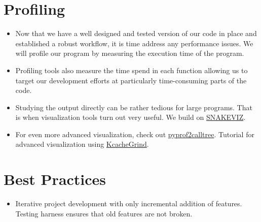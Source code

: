 \section{Profiling}
\begin{itemize}
\item Now that we have a well designed and tested version of our code in place and established a robust workflow, it is time address any performance issues. We will profile our program by measuring the execution time of the program.
\item Profiling tools also measure the time spend in each function allowing us to target our development efforts at particularly time-consuming parts of the code.
\item Studying the output directly can be rather tedious for large programs. That is when visualization tools turn out very useful. We build on \href{http://jiffyclub.github.io/snakeviz}{SNAKEVIZ}.
\item For even more advanced visualization, check out \href{https://github.com/pwaller/pyprof2calltree}{pyprof2calltree}. Tutorial for advanced visualization using \href{http://bit.ly/1SaXJgM}{KcacheGrind}.
\end{itemize}

\section{Best Practices}
\begin{itemize}
\item Iterative project development with only incremental addition of features. Testing harness ensures that old features are not broken.
\end{itemize}
\nocite{Judd.2011, Wilson.2014, Bourque.2014, Schlesinger.1979}


\grid

